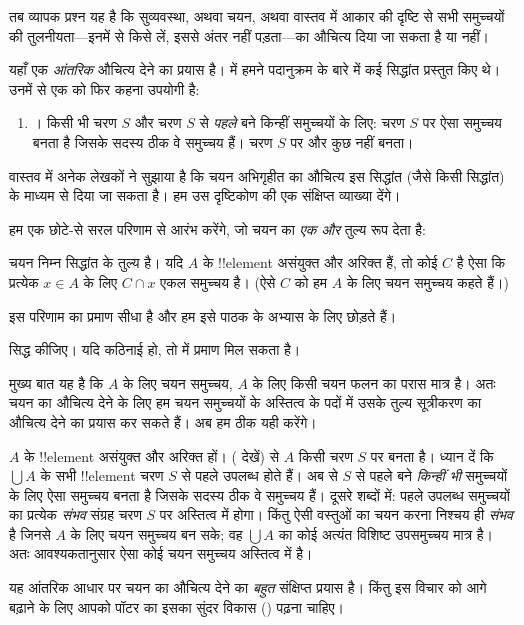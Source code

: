 \documentclass[../../../include/open-logic-section]{subfiles}
\begin{document}

तब व्यापक प्रश्न यह है कि सुव्यवस्था, अथवा चयन, अथवा वास्तव में आकार की
दृष्टि से सभी समुच्चयों की तुलनीयता---इनमें से किसे लें, इससे अंतर नहीं
पड़ता---का औचित्य दिया जा सकता है या नहीं।

यहाँ एक \emph{आंतरिक} औचित्य देने का प्रयास है।  में
हमने पदानुक्रम के बारे में कई सिद्धांत प्रस्तुत किए थे। उनमें से एक को फिर
कहना उपयोगी है:
\begin{enumerate}
	\item[] \stagesacc। किसी भी चरण $S$ और चरण $S$ से \emph{पहले} बने
	किन्हीं समुच्चयों के लिए: चरण $S$ पर ऐसा समुच्चय बनता है जिसके सदस्य ठीक
	वे समुच्चय हैं। चरण $S$ पर और कुछ नहीं बनता।
\end{enumerate}
वास्तव में अनेक लेखकों ने सुझाया है कि चयन अभिगृहीत का औचित्य इस सिद्धांत
(जैसे किसी सिद्धांत) के माध्यम से दिया जा सकता है। हम उस दृष्टिकोण की एक
संक्षिप्त व्याख्या देंगे।

हम एक छोटे-से सरल परिणाम से आरंभ करेंगे, जो चयन का \emph{एक और} तुल्य रूप
देता है:

\begin{thm}[$\ZF$ में]
चयन निम्न सिद्धांत के तुल्य है। यदि $A$ के !!{element} असंयुक्त और अरिक्त
हैं, तो कोई $C$ है ऐसा कि प्रत्येक $x\in A$ के लिए $C\cap x$ एकल समुच्चय
है। (ऐसे $C$ को हम $A$ के लिए {चयन समुच्चय} कहते हैं।)
\end{thm}

इस परिणाम का प्रमाण सीधा है और हम इसे पाठक के अभ्यास के लिए छोड़ते हैं।

\begin{prob}
 सिद्ध कीजिए। यदि कठिनाई हो,
तो \cite[pp.~242--3]{Potter2004} में प्रमाण मिल सकता है।
\end{prob}

मुख्य बात यह है कि $A$ के लिए चयन समुच्चय, $A$ के लिए किसी चयन फलन का
परास मात्र है। अतः चयन का औचित्य देने के लिए हम चयन समुच्चयों के अस्तित्व
के पदों में उसके तुल्य सूत्रीकरण का औचित्य देने का प्रयास कर सकते हैं। अब हम
ठीक यही करेंगे।

$A$ के !!{element} असंयुक्त और अरिक्त हों। \stageshier{}
( देखें) से $A$ किसी चरण $S$ पर बनता है। ध्यान दें कि
$\bigcup A$ के सभी !!{element} चरण $S$ से पहले उपलब्ध होते हैं। अब
\stagesacc{} से $S$ से पहले बने \emph{किन्हीं भी} समुच्चयों के लिए ऐसा
समुच्चय बनता है जिसके सदस्य ठीक वे समुच्चय हैं। दूसरे शब्दों में: पहले
उपलब्ध समुच्चयों का प्रत्येक \emph{संभव} संग्रह चरण $S$ पर अस्तित्व में
होगा। किंतु ऐसी वस्तुओं का चयन करना निश्चय ही \emph{संभव} है जिनसे $A$ के
लिए चयन समुच्चय बन सके; वह $\bigcup A$ का कोई अत्यंत विशिष्ट उपसमुच्चय
मात्र है। अतः आवश्यकतानुसार ऐसा कोई चयन समुच्चय अस्तित्व में है।

यह आंतरिक आधार पर चयन का औचित्य देने का \emph{बहुत} संक्षिप्त प्रयास है।
किंतु इस विचार को आगे बढ़ाने के लिए आपको पॉटर का इसका सुंदर विकास
(\citeyear[\S14.8]{Potter2004}) पढ़ना चाहिए।
\end{document}
